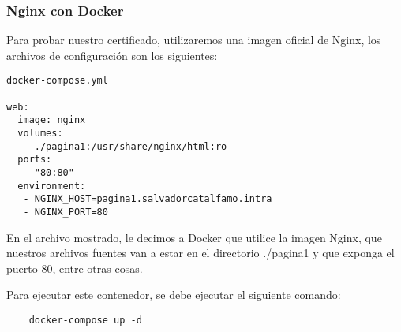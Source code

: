 \subsubsection*{Nginx con Docker}

Para probar nuestro certificado, utilizaremos una imagen oficial de Nginx, 
los archivos de configuración
son los siguientes:


\begin{verbatim}
docker-compose.yml

web:
  image: nginx
  volumes:
   - ./pagina1:/usr/share/nginx/html:ro
  ports:
   - "80:80"
  environment:
   - NGINX_HOST=pagina1.salvadorcatalfamo.intra
   - NGINX_PORT=80
\end{verbatim}

En el archivo mostrado, le decimos a Docker que utilice la imagen Nginx, 
que nuestros archivos fuentes
van a estar en el directorio ./pagina1 y que exponga el puerto 80, entre otras
 cosas.

\noindent Para ejecutar este contenedor, se debe ejecutar el siguiente comando:

\begin{verbatim}
    docker-compose up -d
\end{verbatim}


